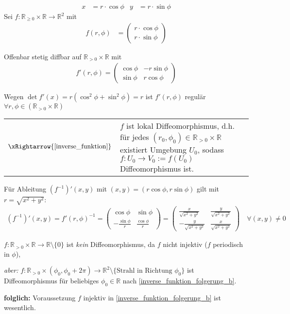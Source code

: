 \begin{example}
	{\zeroAmsmathAlignVSpaces*\begin{align*}
		x &= r\cdot \cos\phi & y &= r\cdot\sin\phi
	\end{align*}}
	Sei $f:\mathbb{R}_{\ge 0}\times\mathbb{R}\to\mathbb{R}^2$ mit \begin{align*}
		f(r,\phi) &= \begin{pmatrix}
			r\cdot\cos\phi \\ r\cdot\sin\phi
		\end{pmatrix}
	\end{align*}
	
	Offenbar stetig \gls{diffbar} auf $\mathbb{R}_{>0}\times\mathbb{R}$ mit \begin{align*}
		f'(r,\phi) = \begin{pmatrix}
			\cos\phi & -r\sin\phi \\ \sin\phi & r\cos\phi
		\end{pmatrix}
	\end{align*}
	
	Wegen $\det f'(x) = r(\cos^2\phi + \sin^2\phi) = r$ ist $f'(r,\phi)$ regulär $\forall r,\phi\in (\mathbb{R}_{>0}\times\mathbb{R})$ \\
	\begin{tabularx}{\linewidth}{r@{\ \ }X}
	$\xRightarrow{\text{\cref{inverse_funktion}}}$ & $f$ ist lokal Diffeomorphismus, d.h. für jedes $(r_0, \phi_0)\in\mathbb{R}_{>0}\times\mathbb{R}$ existiert Umgebung $U_0$, sodass $f:U_0\to V_0 :=f(U_0)$ Diffeomorphismus ist.
	\end{tabularx}
	
	Für Ableitung $(f^{-1})'(x,y)$ mit $(x,y) = (r\cos\phi, r\sin\phi)$ gilt mit $r = \sqrt{x^2 + y^2}$:\begin{align*}
		\left(f^{-1}\right)'(x,y) = f'(r,\phi)^{-1} = \begin{pmatrix}
			\cos\phi & \sin\phi \\ -\frac{\sin\phi}{r} & \frac{\cos\phi}{r}
			\end{pmatrix}
			 = \begin{pmatrix}
				\frac{x}{\sqrt{x^2+y^2}} & \frac{y}{\sqrt{x^2 + y^2}} \\
				-\frac{y}{\sqrt{x^2+y^2}} & \frac{x}{\sqrt{x^2+y^2}}
			\end{pmatrix}\quad\forall (x,y)\neq 0
	\end{align*}
	
	\begin{underlinedenvironment}[beachte]
		$f:\mathbb{R}_{>0}\times\mathbb{R}\to\mathbb{R}\setminus\{0\}$ ist \emph{kein} Diffeomorphismus, da $f$ nicht injektiv ($f$ periodisch in $\phi$),
		
		\emph{aber:} $f:\mathbb{R}_{>0}\times(\phi_0, \phi_0+2\pi)\to\mathbb{R}^2\setminus \{\text{Strahl in Richtung $\phi_0$}\}$ ist Diffeomorphismus für beliebiges $\phi_0\in \mathbb{R}$ nach  \ref{inverse_funktion_folgerung_b}.
	\end{underlinedenvironment}

\textbf{folglich:} Voraussetzung $f$ injektiv in  \ref{inverse_funktion_folgerung_b} ist wesentlich.
\end{example}
